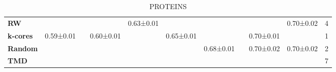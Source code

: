 \begin{table}[H]
\begin{subtable}{\textwidth}
{\begin{tabular}{l|c|c|c|c|c|c|c|c|c|c}
\hline
\textbf{RW}
    & \cellcolor{green!80}{0.61±0.01}
    & \cellcolor{green!80}{0.60±0.01}
    & \cellcolor{green!80}{0.63±0.01}
    & 0.63±0.01
    & \cellcolor{green!25}{0.67±0.02}
    & \cellcolor{green!25}{0.69±0.01}
    & \cellcolor{green!25}{0.68±0.02}
    & \cellcolor{green!80}{0.72±0.01}
    & 0.70±0.02
    & 4 \\
\textbf{k-cores}
    & 0.59±0.01
    & \cellcolor{green!80}{0.60±0.01}
    & 0.60±0.01
    & \cellcolor{green!25}{0.64±0.02}
    & 0.65±0.01
    & \cellcolor{green!25}{0.69±0.02}
    & \cellcolor{green!25}{0.68±0.02}
    & 0.70±0.01
    & \cellcolor{green!25}{0.71±0.01}
    & 1 \\
\textbf{Random}
    & \cellcolor{green!25}{0.60±0.01}
    & \cellcolor{green!80}{0.60±0.01}
    & \cellcolor{green!25}{0.62±0.02}
    & \cellcolor{green!25}{0.64±0.02}
    & \cellcolor{green!25}{0.67±0.02}
    & 0.68±0.01
    & \cellcolor{green!80}{0.71±0.01}
    & 0.70±0.02
    & 0.70±0.02
    & 2 \\
\textbf{TMD}
    & \cellcolor{green!25}{0.60±0.01}
    & \cellcolor{green!80}{0.60±0.01}
    & \cellcolor{green!80}{0.63±0.01}
    & \cellcolor{green!80}{0.65±0.01}
    & \cellcolor{green!80}{0.68±0.01}
    & \cellcolor{green!80}{0.70±0.01}
    & \cellcolor{green!80}{0.71±0.01}
    & \cellcolor{green!25}{0.71±0.01}
    & \cellcolor{green!80}{0.73±0.01}
    & 7 \\
\hline
\end{tabular}
}
\caption{PROTEINS}
\label{tab:proteins-pivot}
\end{subtable}

\vspace{0em}

\begin{subtable}{\textwidth}
\centering
{}
\end{subtable}
\end{table}
